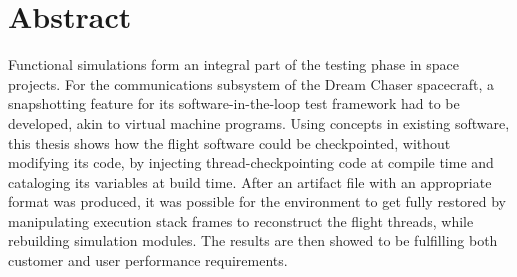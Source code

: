 \chapter*{Abstract}\label{cha:abstract}
Functional simulations form an integral part of the testing phase in space projects. For the communications subsystem of the Dream Chaser spacecraft, a snapshotting feature for its software-in-the-loop test framework had to be developed, akin to virtual machine programs. Using concepts in existing software, this thesis shows how the flight software could be checkpointed, without modifying its code, by injecting thread-checkpointing code at compile time and cataloging its variables at build time. After an artifact file with an appropriate format was produced, it was possible for the environment to get fully restored by manipulating execution stack frames to reconstruct the flight threads, while rebuilding simulation modules. The results are then showed to be fulfilling both customer and user performance requirements.